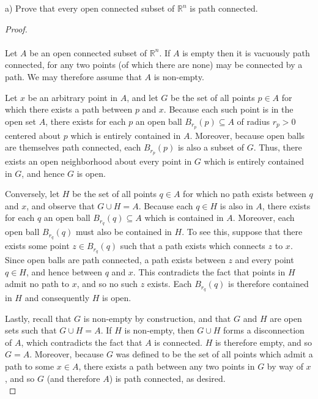a) Prove that every open connected subset of $\mathbb{R}^n$ is path connected.

\begin{proof}\ \\\\
    Let $A$ be an open connected subset of $\mathbb{R}^n$. If $A$ is empty then it is vacuously path connected, for any
    two points (of which there are none) may be connected by a path. We may therefore assume that $A$ is non-empty.

    Let $x$ be an arbitrary point in $A$, and let $G$ be the set of all points $p \in A$ for which there exists a path 
    between $p$ and $x$. Because each such point is in the open set $A$, there exists for each $p$ an open ball 
    $B_{r_p}(p) \subseteq A$ of radius $r_p > 0$ centered about $p$ which is entirely contained in $A$. Moreover, 
    because open balls are themselves path connected, each $B_{r_p}(p)$ is also a subset of $G$. Thus, there exists an 
    open neighborhood about every point in $G$ which is entirely contained in $G$, and hence $G$ is open.

    Conversely, let $H$ be the set of all points $q \in A$ for which no path exists between $q$ and $x$, and observe
    that $G \cup H = A$. Because each $q \in H$ is also in $A$, there exists for each $q$ an open ball 
    $B_{r_q}(q) \subseteq A$ which is contained in $A$. Moreover, each open ball $B_{r_q}(q)$ must also be contained in 
    $H$. To see this, suppose that there exists some point $z \in B_{r_q}(q)$ such that a path exists which connects 
    $z$ to $x$. Since open balls are path connected, a path exists between $z$ and every point $q \in H$, and hence
    between $q$ and $x$. This contradicts the fact that points in $H$ admit no path to $x$, and so no such $z$ exists.
    Each $B_{r_q}(q)$ is therefore contained in $H$ and consequently $H$ is open.

    Lastly, recall that $G$ is non-empty by construction, and that $G$ and $H$ are open sets such that $G \cup H = A$.
    If $H$ is non-empty, then $G \cup H$ forms a disconnection of $A$, which contradicts the fact that $A$ is connected.
    $H$ is therefore empty, and so $G = A$. Moreover, because $G$ was defined to be the set of all points which admit a
    path to some $x \in A$, there exists a path between any two points in $G$ by way of $x$, and so $G$ (and therefore
    $A$) is path connected, as desired.
    \ \\
\end{proof}

